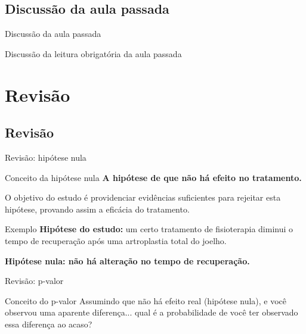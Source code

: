 \documentclass{beamer}
\begin{document}
\subsection{Discussão da aula passada}

\begin{frame}{Discussão da aula passada}
  \begin{block}{}
    Discussão da leitura obrigatória da aula passada
  \end{block}
\end{frame}

\section{Revisão}

\subsection{Revisão}

\begin{frame}{Revisão: hipótese nula}
  \begin{block}{Conceito da hipótese nula}
    {\bf A hipótese de que não há efeito no tratamento.}

    \bigskip
    O objetivo do estudo é providenciar evidências suficientes para rejeitar esta hipótese, provando assim a eficácia do tratamento.
  \end{block}
  \begin{exampleblock}{Exemplo}
    {\bf Hipótese do estudo:} um certo tratamento de fisioterapia diminui o tempo de recuperação após uma artroplastia total do joelho.

    \bigskip
    {\bf Hipótese nula: não há alteração no tempo de recuperação.}
  \end{exampleblock}
\end{frame}

\begin{frame}{Revisão: p-valor}
  \begin{block}{Conceito do p-valor}
    Assumindo que não há efeito real (hipótese nula), e você observou uma aparente diferença... qual é a probabilidade de você ter observado essa diferença ao acaso?
  \end{block}
\end{frame}
\end{document}
